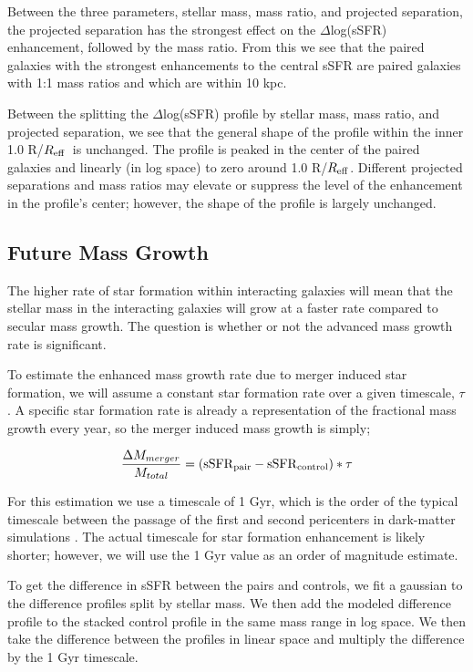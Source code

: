 \documentclass[iop,revtex4,twocolumn,apj,numberedappendix,appendixfloats]{emulateapj}
\newcommand{\reff}{$R_{\rm eff}$}
\begin{document}
Between the three parameters, stellar mass, mass ratio, and projected separation, the projected separation has the strongest effect on the $\Delta$log(sSFR) enhancement, followed by the mass ratio. From this we see that the paired galaxies with the strongest enhancements to the central sSFR are paired galaxies with 1:1 mass ratios and  which are within 10 kpc. 

Between the splitting the $\Delta$log(sSFR) profile by stellar mass, mass ratio, and projected separation, we see that the general shape of the profile within the inner 1.0 R/\reff\ is unchanged. The profile is peaked in the center of the paired galaxies and linearly (in log space) to zero around 1.0 R/\reff. Different projected separations and mass ratios may elevate or suppress the level of the enhancement in the profile's center; however, the shape of the profile is largely unchanged.

\subsection{Future Mass Growth}

The higher rate of star formation within interacting galaxies will mean that the stellar mass in the interacting galaxies will grow at a faster rate compared to secular mass growth. The question is whether or not the advanced mass growth rate is significant. 

To estimate the enhanced mass growth rate due to merger induced star formation, we will assume a constant star formation rate over a given timescale, $\tau$. A specific star formation rate is already a representation of the fractional mass growth every year, so the merger induced mass growth is simply;

\begin{equation}
\frac{\Delta M_{merger}}{M_{total}} = \left({\rm sSFR}_{\rm pair} - {\rm sSFR}_{\rm control}\right) * \tau
\end{equation}

For this estimation we use a timescale of 1 Gyr, which is the order of the typical timescale between the passage of the first and second pericenters in dark-matter simulations \citep{Boylan-Kolchin:2008}. The actual timescale for star formation enhancement is likely shorter; however, we will use the 1 Gyr value as an order of magnitude estimate. 

To get the difference in sSFR between the pairs and controls, we fit a gaussian to the difference profiles split by stellar mass. We then add the modeled difference profile to the stacked control profile in the same mass range in log space. We then take the difference between the profiles in linear space and multiply the difference by the 1 Gyr timescale. 
\end{document}
